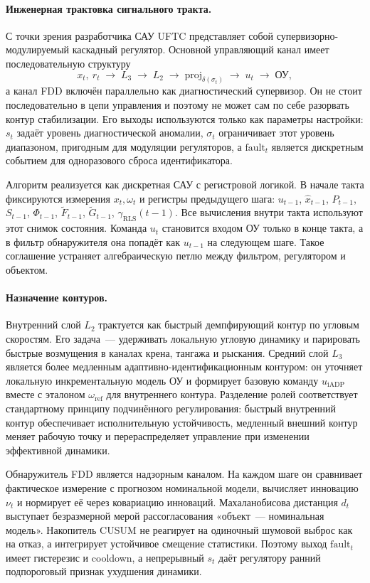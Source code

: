 \documentclass[a4paper,14pt]{extarticle}
\newcommand{\UFTC}{\textsc{UFTC}}
\newcommand{\FDD}{\textsc{FDD}}
\newcommand{\CUSUM}{\textsc{CUSUM}}
\begin{document}
\paragraph{Инженерная трактовка сигнального тракта.} С точки зрения разработчика САУ \UFTC{} представляет собой супервизорно-модулируемый каскадный регулятор. Основной управляющий канал имеет последовательную структуру
\[
x_t,\ r_t \;\longrightarrow\; L_3 \;\longrightarrow\; L_2 \;\longrightarrow\; \mathrm{proj}_{\delta(\sigma_t)} \;\longrightarrow\; u_t \;\longrightarrow\; \text{ОУ},
\]
а канал \FDD{} включён параллельно как диагностический супервизор. Он не стоит последовательно в цепи управления и поэтому не может сам по себе разорвать контур стабилизации. Его выходы используются только как параметры настройки: $s_t$ задаёт уровень диагностической аномалии, $\sigma_t$ ограничивает этот уровень диапазоном, пригодным для модуляции регуляторов, а $\text{fault}_t$ является дискретным событием для одноразового сброса идентификатора.

Алгоритм реализуется как дискретная САУ с регистровой логикой. В начале такта фиксируются измерения $x_t,\omega_t$ и регистры предыдущего шага: $u_{t-1}$, $\hat x_{t-1}$, $P_{t-1}$, $S_{t-1}$, $\Phi_{t-1}$, $\tilde F_{t-1}$, $\tilde G_{t-1}$, $\gamma_{\text{RLS}}(t-1)$. Все вычисления внутри такта используют этот снимок состояния. Команда $u_t$ становится входом ОУ только в конце такта, а в фильтр обнаружителя она попадёт как $u_{t-1}$ на следующем шаге. Такое соглашение устраняет алгебраическую петлю между фильтром, регулятором и объектом.

\paragraph{Назначение контуров.} Внутренний слой $L_2$ трактуется как быстрый демпфирующий контур по угловым скоростям. Его задача~--- удерживать локальную угловую динамику и парировать быстрые возмущения в каналах крена, тангажа и рыскания. Средний слой $L_3$ является более медленным адаптивно-идентификационным контуром: он уточняет локальную инкрементальную модель ОУ и формирует базовую команду $u_{\text{iADP}}$ вместе с эталоном $\omega_{\text{ref}}$ для внутреннего контура. Разделение ролей соответствует стандартному принципу подчинённого регулирования: быстрый внутренний контур обеспечивает исполнительную устойчивость, медленный внешний контур меняет рабочую точку и перераспределяет управление при изменении эффективной динамики.

Обнаружитель \FDD{} является надзорным каналом. На каждом шаге он сравнивает фактическое измерение с прогнозом номинальной модели, вычисляет инновацию $\nu_t$ и нормирует её через ковариацию инноваций. Махаланобисова дистанция $d_t$ выступает безразмерной мерой рассогласования «объект~--- номинальная модель». Накопитель \CUSUM{} не реагирует на одиночный шумовой выброс как на отказ, а интегрирует устойчивое смещение статистики. Поэтому выход $\text{fault}_t$ имеет гистерезис и cooldown, а непрерывный $s_t$ даёт регулятору ранний подпороговый признак ухудшения динамики.
\end{document}
